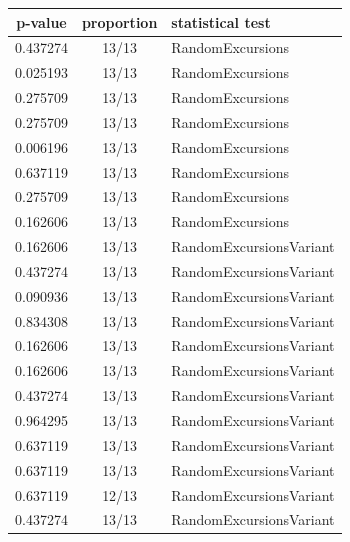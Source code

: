 \documentclass[conference]{IEEEtran}
\begin{document}
\begin{center}
\begin{table}
\renewcommand{\arraystretch}{1.2}
\centering
\begin{tabular}{|c|c|l|}
\hline
\textbf{p-value} & \textbf{proportion} & \textbf{statistical test} \\ \hline
0.437274         & 13/13               & RandomExcursions          \\ \hline
0.025193         & 13/13               & RandomExcursions          \\ \hline
0.275709         & 13/13               & RandomExcursions          \\ \hline
0.275709         & 13/13               & RandomExcursions          \\ \hline
0.006196         & 13/13               & RandomExcursions          \\ \hline
0.637119         & 13/13               & RandomExcursions          \\ \hline
0.275709         & 13/13               & RandomExcursions          \\ \hline
0.162606         & 13/13               & RandomExcursions          \\ \hline
0.162606         & 13/13               & RandomExcursionsVariant   \\ \hline
0.437274         & 13/13               & RandomExcursionsVariant   \\ \hline
0.090936         & 13/13               & RandomExcursionsVariant   \\ \hline
0.834308         & 13/13               & RandomExcursionsVariant   \\ \hline
0.162606         & 13/13               & RandomExcursionsVariant   \\ \hline
0.162606         & 13/13               & RandomExcursionsVariant   \\ \hline
0.437274         & 13/13               & RandomExcursionsVariant   \\ \hline
0.964295         & 13/13               & RandomExcursionsVariant   \\ \hline
0.637119         & 13/13               & RandomExcursionsVariant   \\ \hline
0.637119         & 13/13               & RandomExcursionsVariant   \\ \hline
0.637119         & 12/13               & RandomExcursionsVariant   \\ \hline
0.437274         & 13/13               & RandomExcursionsVariant   \\ \hline

\end{tabular}
\end{table}
\end{center}
\end{document}
